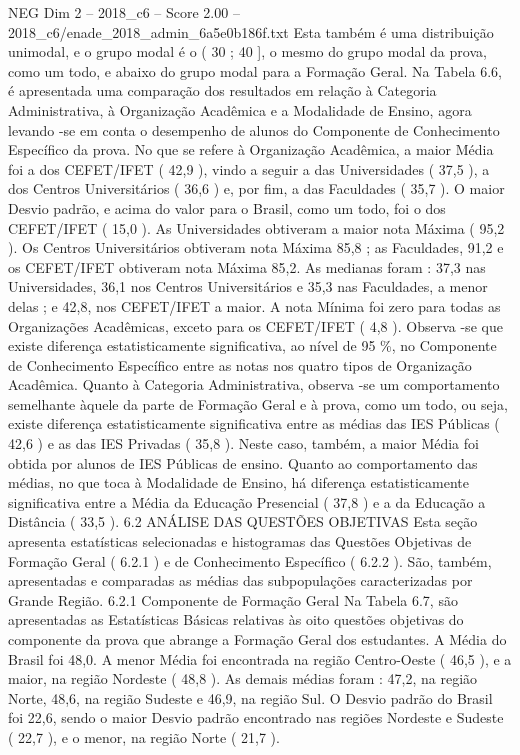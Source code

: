 \begin{textsample}{NEG Dim 2 – 2018\_c6 – Score 2.00 – 2018\_c6/enade\_2018\_admin\_6a5e0b186f.txt}
Esta também é uma distribuição unimodal, e o grupo modal é o ( 30 ; 40 ], o mesmo do grupo modal da prova, como um todo, e abaixo do grupo modal para a Formação Geral.
Na Tabela 6.6, é apresentada uma comparação dos resultados em relação à Categoria Administrativa, à Organização Acadêmica e a Modalidade de Ensino, agora levando -se em conta o desempenho de alunos do Componente de Conhecimento Específico da prova.
No que se refere à Organização Acadêmica, a maior Média foi a dos CEFET/IFET ( 42,9 ), vindo a seguir a das Universidades ( 37,5 ), a dos Centros Universitários ( 36,6 ) e, por fim, a das Faculdades ( 35,7 ).
O maior Desvio padrão, e acima do valor para o Brasil, como um todo, foi o dos CEFET/IFET ( 15,0 ).
As Universidades obtiveram a maior nota Máxima ( 95,2 ).
Os Centros Universitários obtiveram nota Máxima 85,8 ; as Faculdades, 91,2 e os CEFET/IFET obtiveram nota Máxima 85,2.
As medianas foram : 37,3 nas Universidades, 36,1 nos Centros Universitários e 35,3 nas Faculdades, a menor delas ; e 42,8, nos CEFET/IFET a maior.
A nota Mínima foi zero para todas as Organizações Acadêmicas, exceto para os CEFET/IFET ( 4,8 ).
Observa -se que existe diferença estatisticamente significativa, ao nível de 95 \%, no Componente de Conhecimento Específico entre as notas nos quatro tipos de Organização Acadêmica.
Quanto à Categoria Administrativa, observa -se um comportamento semelhante àquele da parte de Formação Geral e à prova, como um todo, ou seja, existe diferença estatisticamente significativa entre as médias das IES Públicas ( 42,6 ) e as das IES Privadas ( 35,8 ).
Neste caso, também, a maior Média foi obtida por alunos de IES Públicas de ensino.
Quanto ao comportamento das médias, no que toca à Modalidade de Ensino, há diferença estatisticamente significativa entre a Média da Educação Presencial ( 37,8 ) e a da Educação a Distância ( 33,5 ). 6.2 ANÁLISE DAS QUESTÕES OBJETIVAS Esta seção apresenta estatísticas selecionadas e histogramas das Questões Objetivas de Formação Geral ( 6.2.1 ) e de Conhecimento Específico ( 6.2.2 ).
São, também, apresentadas e comparadas as médias das subpopulações caracterizadas por Grande Região. 6.2.1 Componente de Formação Geral Na Tabela 6.7, são apresentadas as Estatísticas Básicas relativas às oito questões objetivas do componente da prova que abrange a Formação Geral dos estudantes.
A Média do Brasil foi 48,0.
A menor Média foi encontrada na região Centro-Oeste ( 46,5 ), e a maior, na região Nordeste ( 48,8 ).
As demais médias foram : 47,2, na região Norte, 48,6, na região Sudeste e 46,9, na região Sul.
O Desvio padrão do Brasil foi 22,6, sendo o maior Desvio padrão encontrado nas regiões Nordeste e Sudeste ( 22,7 ), e o menor, na região Norte ( 21,7 ).

\end{textsample}
